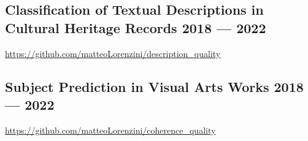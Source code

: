 \documentclass[letter,10pt]{article}
\begin{document}
\subsection{{Classification of Textual Descriptions in Cultural Heritage Records  \hfill 2018 --- 2022}}

\begin{zitemize}
\item \href{https://github.com/matteoLorenzini/description_quality}{https://github.com/matteoLorenzini/description\_quality}
\end{zitemize}

\subsection{{Subject Prediction in Visual Arts Works  \hfill 2018 --- 2022}}

\begin{zitemize}
\item \href{https://github.com/matteoLorenzini/coherence_quality}{https://github.com/matteoLorenzini/coherence\_quality} 

\end{zitemize}
\end{document}
